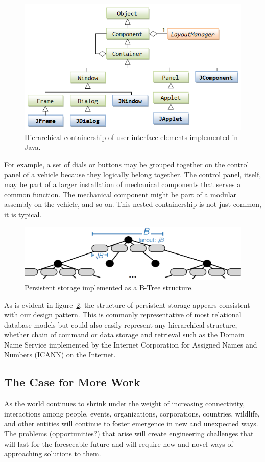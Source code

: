 \documentclass[jou,apacite]{apa6}
\begin{document}
\begin{figure}[htpb]
  \centering
  \includegraphics[width=0.75\columnwidth]{images/container.png}
  \caption{Hierarchical containership of user interface elements implemented in Java.}
  \label{fig:container}
\end{figure}

For example, a set of dials or buttons may be grouped together on the control panel of a vehicle because they logically belong together.  The control panel,  itself, may be part of a larger installation of mechanical components that serves a common function.  The mechanical component might be part of a modular assembly on the vehicle, and so on.  This nested containership is not just common, it is typical.

\begin{figure}[htpb]
  \centering
  \includegraphics[width=0.75\columnwidth]{images/BTree.png}
  \caption{Persistent storage implemented as a B-Tree structure.}
  \label{fig:btree}
\end{figure}

As is evident in figure~\ref{fig:btree}, the structure of persistent storage appears consistent with our design pattern.  This is commonly representative of most relational database models but could also easily represent any hierarchical structure, whether chain of command or data storage and retrieval such as the Domain Name Service implemented by the Internet Corporation for Assigned Names and Numbers (ICANN) on the Internet.

\subsection{The Case for More Work}
As the world continues to shrink under the weight of increasing connectivity, interactions among people, events, organizations, corporations, countries, wildlife, and other entities will continue to foster emergence in new and unexpected ways.  The problems (opportunities?) that arise will create engineering challenges that will last for the foreseeable future and will require new and novel ways of approaching solutions to them.
\end{document}
